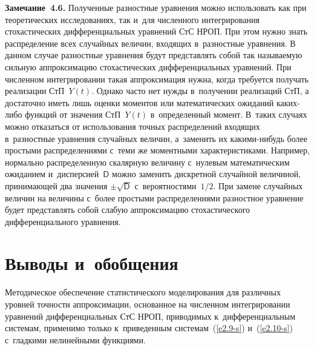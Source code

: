 \begin{multicols}{2}
\noindent
\textbf{Замечание~4.6.}
Полученные разностные уравнения можно использовать как при
теоретических исследованиях, так и~для численного интегрирования
стохастических дифференциальных уравнений СтС НРОП. При этом нужно знать
распределение всех случайных величин, входящих в~разностные уравнения.
В данном случае разностные уравнения будут представлять собой так называемую
сильную аппроксимацию стохастических дифференциальных уравнений.
При численном интегрировании такая аппроксимация нужна, когда требуется
получать реализации СтП~$Y(t)$. Однако часто нет
нужды в~получении реализаций СтП, а достаточно иметь лишь
оценки моментов или математических ожиданий ка\-ких-ли\-бо функций от значения
СтП~$Y(t)$ в~определенный момент. В~таких случаях можно
отказаться от использования точных распределений входящих в~разностные
уравнения случайных величин, а~заменить их ка\-ки\-ми-ни\-будь более
простыми распределениями с~теми же моментными характеристиками.
Например, нормально распределенную скалярную величину с~нулевым
математическим ожиданием и~дисперсией~${\mathsf D}$ можно заменить дискретной
случайной величиной, принимающей два значения $\pm\sqrt{\mathsf{D}}$ с~вероятностями~$1/2$. При замене случайных величин на величины с~более простыми распределениями разностное уравнение будет представлять
собой слабую аппроксимацию стохастического
дифференциального уравнения.

\vspace*{-6pt}

\section{Выводы и~обобщения}

\vspace*{-3pt}

Методическое обеспечение статистического моделирования для различных уровней 
точности аппроксимации, основанное на численном интегрировании уравнений 
дифференциальных СтС НРОП, приводимых к~дифференциальным системам, применимо 
только к~приведенным системам~(\ref{e2.9-s}) и~(\ref{e2.10-s}) с~гладкими нелинейными функциями.


\end{multicols}
